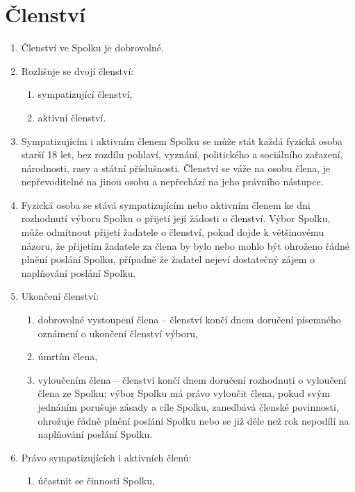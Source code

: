 \documentclass[11pt,a4paper]{article}
\begin{document}
\section{Členství}
\begin{enumerate}[itemsep=0pt]
    \item Členství ve Spolku je dobrovolné.
    \item Rozlišuje se dvojí členství:
    \begin{enumerate}[itemsep=0pt,topsep=0pt]
        \item sympatizující členství,
        \item aktivní členství.
    \end{enumerate}
    \item Sympatizujícím i aktivním členem Spolku se může stát každá fyzická 
    osoba starší 18 let, bez rozdílu pohlaví, vyznání, politického a sociálního 
    zařazení, národnosti, rasy a státní příslušnosti. Členství se váže na osobu 
    člena, je nepřevoditelné na jinou osobu a nepřechází na jeho 
    právního nástupce. 
    \item Fyzická osoba se stává sympatizujícím nebo aktivním členem ke dni 
    rozhodnutí výboru Spolku o přijetí její žádosti o členství. Výbor Spolku, 
    může odmítnout přijetí žadatele o členství, pokud dojde k většinovému 
    názoru, že přijetím žadatele za člena by bylo nebo mohlo být ohroženo 
    řádné plnění poslání Spolku, případně že žadatel nejeví dostatečný zájem 
    o naplňování poslání Spolku.
    \item Ukončení členství:
    \begin{enumerate}[itemsep=0pt,topsep=0pt]
        \item dobrovolné vystoupení člena – členství končí dnem doručení 
        písemného oznámení o ukončení členství výboru,
        \item úmrtím člena,
        \item vyloučením člena – členství končí dnem doručení rozhodnutí 
        o vyloučení člena ze Spolku; výbor Spolku má právo vyloučit člena, 
        pokud svým jednáním porušuje zásady a cíle Spolku, zanedbává členské 
        povinnosti, ohrožuje řádně plnění poslání Spolku nebo se již déle než 
        rok nepodílí na naplňování poslání Spolku.
    \end{enumerate}
    \item Právo sympatizujících i aktivních členů:
    \begin{enumerate}[itemsep=0pt,topsep=0pt]
        \item účastnit se činnosti Spolku,

\end{enumerate}
\end{enumerate}
\end{document}
